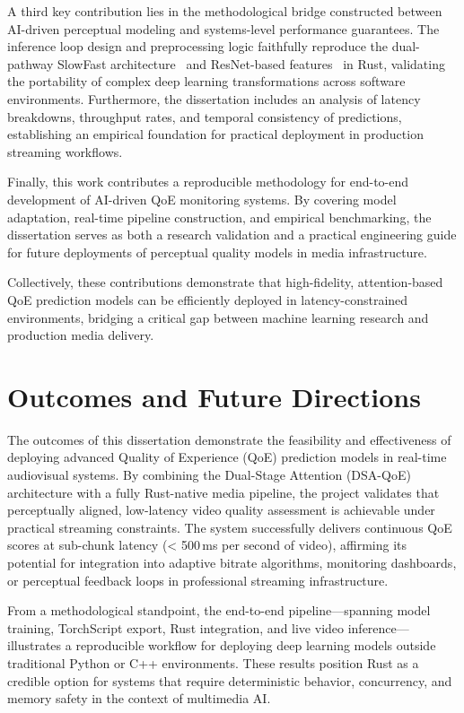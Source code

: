 A third key contribution lies in the methodological bridge constructed between AI-driven perceptual modeling and systems-level performance guarantees. The inference loop design and preprocessing logic faithfully reproduce the dual-pathway SlowFast architecture~\cite{feichtenhofer2019slowfast} and ResNet-based features~\cite{he2016deep} in Rust, validating the portability of complex deep learning transformations across software environments. Furthermore, the dissertation includes an analysis of latency breakdowns, throughput rates, and temporal consistency of predictions, establishing an empirical foundation for practical deployment in production streaming workflows.

Finally, this work contributes a reproducible methodology for end-to-end development of AI-driven QoE monitoring systems. By covering model adaptation, real-time pipeline construction, and empirical benchmarking, the dissertation serves as both a research validation and a practical engineering guide for future deployments of perceptual quality models in media infrastructure.

Collectively, these contributions demonstrate that high-fidelity, attention-based QoE prediction models can be efficiently deployed in latency-constrained environments, bridging a critical gap between machine learning research and production media delivery.

\section{Outcomes and Future Directions}

The outcomes of this dissertation demonstrate the feasibility and effectiveness of deploying advanced Quality of Experience (QoE) prediction models in real-time audiovisual systems. By combining the Dual-Stage Attention (DSA-QoE) architecture with a fully Rust-native media pipeline, the project validates that perceptually aligned, low-latency video quality assessment is achievable under practical streaming constraints. The system successfully delivers continuous QoE scores at sub-chunk latency (< 500\,ms per second of video), affirming its potential for integration into adaptive bitrate algorithms, monitoring dashboards, or perceptual feedback loops in professional streaming infrastructure.

From a methodological standpoint, the end-to-end pipeline—spanning model training, TorchScript export, Rust integration, and live video inference—illustrates a reproducible workflow for deploying deep learning models outside traditional Python or C++ environments. These results position Rust as a credible option for systems that require deterministic behavior, concurrency, and memory safety in the context of multimedia AI.

